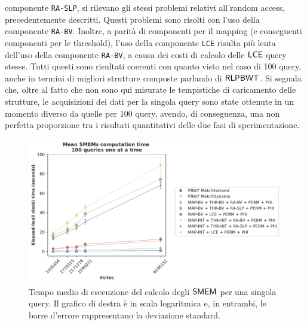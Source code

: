 componente \texttt{RA-SLP}, si rilevano gli stessi problemi relativi all'random
access, precedentemente descritti. Questi problemi sono risolti con l'uso della
componente \texttt{RA-BV}. Inoltre, a parità di componenti per il mapping (e
conseguenti componenti per le threshold), l'uso della componente \texttt{LCE}
risulta più lenta dell'uso della componente \texttt{RA-BV}, a causa dei costi di
calcolo delle $\mbox{\rm {\sf LCE}}$ query stesse. Tutti questi sono risultati coerenti
con quanto visto nel caso di 100 query, anche in termini di migliori strutture
composte parlando di $\mbox{\rm {\sf RLPBWT}}$. Si segnala che, oltre al fatto che non
sono qui misurate le tempistiche di caricamento delle strutture, le acquisizioni
dei dati 
per la singola query sono state ottenute in un momento diverso da quelle per 100
query, avendo, di conseguenza, una non perfetta proporzione tra i risultati
quantitativi delle due fasi di sperimentazione.
\begin{figure}
  \centering
  \includegraphics[width=\textwidth]{img/exe_time_single_paper.pdf}
  \caption{Tempo medio di esecuzione del calcolo degli $\mbox{\rm {\sf SMEM}}$ per una singola
    query. Il grafico di destra è in scala logaritmica e, in entrambi, le
    barre d'errore rappresentano la deviazione standard.}
  \label{fig:smemsinglechr}
\end{figure}


